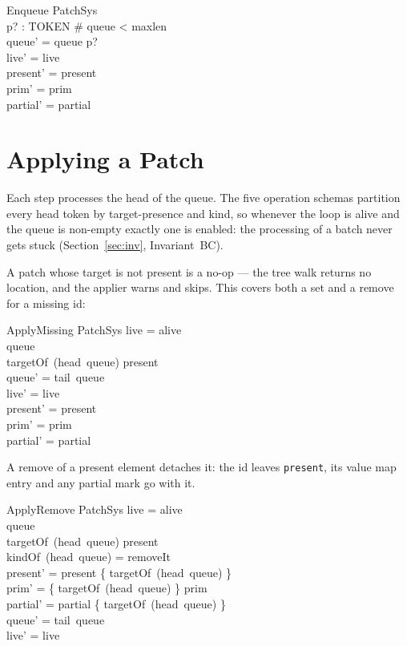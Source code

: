 \documentclass[a4paper,10pt,fleqn]{article}
\begin{document}
\begin{schema}{Enqueue}
  \Delta PatchSys \\
  p? : TOKEN
\where
  \# queue < maxlen \\
  queue' = queue \cat \langle p? \rangle \\
  live' = live \\
  present' = present \\
  prim' = prim \\
  partial' = partial
\end{schema}

\section{Applying a Patch}
\label{sec:apply}

Each step processes the head of the queue.  The five operation schemas
partition every head token by target-presence and kind, so whenever the
loop is alive and the queue is non-empty exactly one is enabled: the
processing of a batch never gets stuck (Section~\ref{sec:inv},
Invariant~BC).

A patch whose target is not present is a no-op --- the tree walk returns no
location, and the applier warns and skips.  This covers both a set and a
remove for a missing id:

\begin{schema}{ApplyMissing}
  \Delta PatchSys
\where
  live = alive \\
  queue \neq \langle \rangle \\
  targetOf~(head~queue) \notin present \\
  queue' = tail~queue \\
  live' = live \\
  present' = present \\
  prim' = prim \\
  partial' = partial
\end{schema}

A remove of a present element detaches it: the id leaves \texttt{present},
its value map entry and any partial mark go with it.

\begin{schema}{ApplyRemove}
  \Delta PatchSys
\where
  live = alive \\
  queue \neq \langle \rangle \\
  targetOf~(head~queue) \in present \\
  kindOf~(head~queue) = removeIt \\
  present' = present \setminus \{ targetOf~(head~queue) \} \\
  prim' = \{ targetOf~(head~queue) \} \ndres prim \\
  partial' = partial \setminus \{ targetOf~(head~queue) \} \\
  queue' = tail~queue \\
  live' = live
\end{schema}
\end{document}
